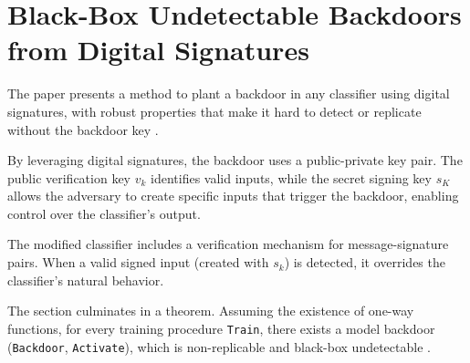 \documentclass[
	fontsize=12pt,
	headings=small,
	parskip=quarter,
	bibliography=totoc,
	numbers=noenddot,       
	open=any,               
 	final                   
]{scrreprt}
\begin{document}
\section{Black-Box Undetectable Backdoors from Digital Signatures}
The paper presents a method to plant a backdoor in any classifier using digital signatures, with robust properties that make it hard to detect or replicate without the backdoor key \cite{song2017machine}.
\par By leveraging digital signatures, the backdoor uses a public-private key pair. The public verification key $v_k$ identifies valid inputs, while the secret signing key $s_K$ allows the adversary to create specific inputs that trigger the backdoor, enabling control over the classifier’s output.
\par The modified classifier includes a verification mechanism for message-signature pairs. When a valid signed input (created with $s_k$) is detected, it overrides the classifier’s natural behavior.
\par The section culminates in a theorem. Assuming the existence of one-way functions, for every training procedure \texttt{Train}, there exists a model backdoor (\texttt{Backdoor}, \texttt{Activate}), which is non-replicable and black-box undetectable \cite{goldwasser2022backdoors}.
\end{document}
